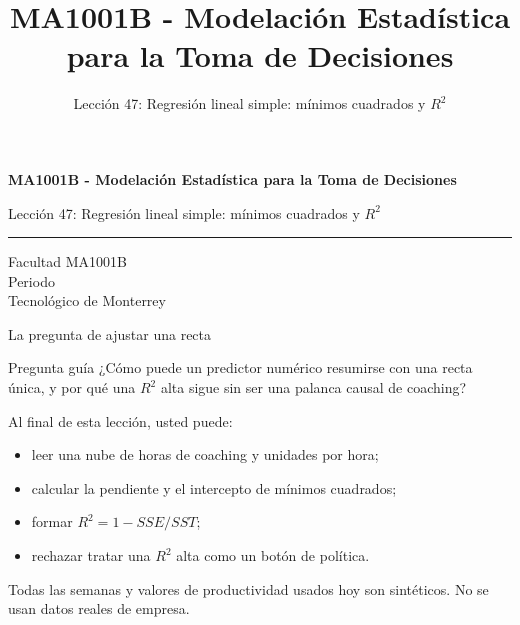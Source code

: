 \documentclass[aspectratio=169,10pt,spanish]{beamer}
\title{MA1001B - Modelación Estadística para la Toma de Decisiones}
\subtitle{Lección 47: Regresión lineal simple: mínimos cuadrados y $R^2$}
\author{}
\institute{Tecnol\'ogico de Monterrey}
\date{}
\begin{document}
\begin{frame}[plain]
  \vspace{1.2cm}
  {\Large\bfseries MA1001B - Modelación Estadística para la Toma de Decisiones\par}
  \vspace{0.7cm}
  {\large Lección 47: Regresión lineal simple: mínimos cuadrados y $R^2$\par}
  \vspace{0.7cm}
  {\color{TecRojo}\rule{\textwidth}{1.2pt}}
  \vspace{0.8cm}

  Facultad MA1001B\\[0.3cm]
  Periodo\\[0.3cm]
  Tecnol\'ogico de Monterrey
\end{frame}

\begin{frame}{La pregunta de ajustar una recta}
  \begin{alertblock}{Pregunta guía}
    ¿Cómo puede un predictor numérico resumirse con una recta única, y por
    qué una $R^2$ alta sigue sin ser una palanca causal de coaching?
  \end{alertblock}

  \vspace{0.6em}
  Al final de esta lección, usted puede:
  \begin{itemize}
    \item leer una nube de horas de coaching y unidades por hora;
    \item calcular la pendiente y el intercepto de mínimos cuadrados;
    \item formar $R^2=1-SSE/SST$;
    \item rechazar tratar una $R^2$ alta como un botón de política.
  \end{itemize}

  \vfill
  \scriptsize Todas las semanas y valores de productividad usados hoy son sintéticos. No se usan datos reales de empresa.
\end{frame}
\end{document}

